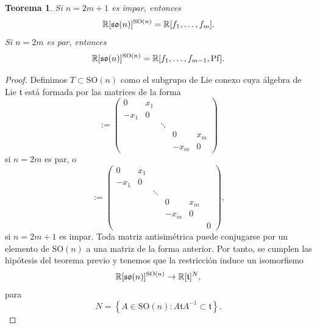 \documentclass[11pt,a4paper]{amsbook}
\newtheorem{thm}[subsection]{Teorema}
\theoremstyle{remark} \newtheorem{rmk}[subsection]{Observación}
\theoremstyle{definition} \newtheorem{defn}[subsection]{Definición}
\theoremstyle{definition} \newtheorem{ex}[subsection]{Ejemplo}
\theoremstyle{definition} \newtheorem{ej}[subsection]{Ejercicio}
\begin{document}
\begin{thm}
  Si $n=2m+1$ es impar, entonces
  \begin{equation*}
\mathbb R[\mathfrak{so}(n)]^{\mathrm{SO}(n)} = \mathbb R[f_1,\dots,f_m].
  \end{equation*}
  Si $n=2m$ es par, entonces
  \begin{equation*}
\mathbb R[\mathfrak{so}(n)]^{\mathrm{SO}(n)} = \mathbb R[f_1,\dots,f_{m-1},\mathrm{Pf}].
  \end{equation*}
\end{thm}

\begin{proof}
Definimos $T\subset \mathrm{SO}(n)$ como el subgrupo de Lie conexo cuya álgebra de Lie $\mathfrak{t}$ está formada por las matrices de la forma
\begin{equation*} [x_1,\dots,x_m]:=
\begin{pmatrix}
0 & x_1 \\
-x_1 & 0 \\
 &  & \ddots \\
 &  & & 0 & x_m \\
 &  & & -x_m & 0
\end{pmatrix}
\end{equation*}
si $n=2m$ es par, o
\begin{equation*} [x_1,\dots,x_m]:=
\begin{pmatrix}
0 & x_1 \\
-x_1 & 0 \\
 &  & \ddots \\
 &  & & 0 & x_m \\
 &  & & -x_m & 0 \\
 &  & & & & 0
\end{pmatrix},
\end{equation*}
si $n=2m+1$ es impar. Toda matriz antisimétrica puede conjugarse por un elemento de $\mathrm{SO}(n)$ a una matriz de la forma anterior. Por tanto, se cumplen las hipótesis del teorema previo y tenemos que la restricción induce un isomorfismo
\begin{equation*}
\mathbb R[\mathfrak{so}(n)]^{\mathrm{SO}(n)} \rightarrow \mathbb R[\mathfrak{t}]^N,
\end{equation*}
para
\begin{equation*}
N = \left\{ A \in \mathrm{SO}(n): A \mathfrak{t} A^{-1} \subset \mathfrak{t} \right\}.
\end{equation*}


\end{proof}
\end{document}
